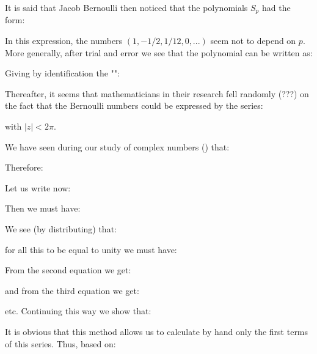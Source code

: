 	It is said that Jacob Bernoulli  then noticed that the polynomials $S_p$ had the form:
	
	In this expression, the numbers $(1,-1/2,1/12,0,...)$ seem not to depend on $p$. More generally, after trial and error we see that the polynomial can be written as:
	
	Giving by identification the "":
	
	\begin{theorem}
	Thereafter, it seems that mathematicians in their research fell randomly (???) on the fact that the Bernoulli numbers could be expressed by the series:
	
	with $\vert z\vert<2\pi$.
	\end{theorem}
	\begin{dem}
	We have seen during our study of complex numbers () that:
		
		Therefore:
		
		Let us write now:
		
		Then we must have:
		
		We see (by distributing) that:
		
		for all this to be equal to unity we must have:
		
		From the second equation we get:
		
		and from the third equation we get:
		
		etc. Continuing this way we show that:
		
		It is obvious that this method allows us to calculate by hand only the first terms of this series.
		Thus, based on:
		

\end{dem}
